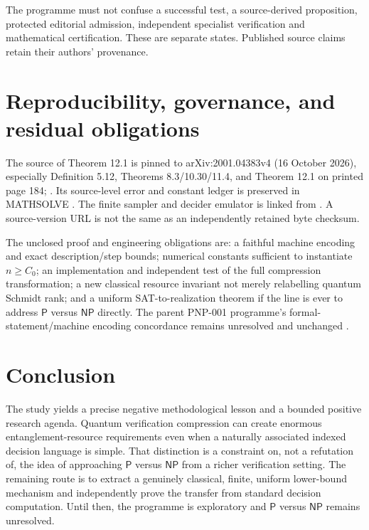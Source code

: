 \documentclass[11pt,a4paper]{article}
\newcommand{\Pclass}{\mathsf{P}}
\newcommand{\NPclass}{\mathsf{NP}}
\begin{document}
The programme must not confuse a successful test, a source-derived proposition, protected editorial admission, independent specialist verification and mathematical certification. These are separate states. Published source claims retain their authors' provenance.

\section{Reproducibility, governance, and residual obligations}
The source of Theorem 12.1 is pinned to arXiv:2001.04383v4 (16 October 2026), especially Definition 5.12, Theorems 8.3/10.30/11.4, and Theorem 12.1 on printed page 184; \cite{jnvwy}. Its source-level error and constant ledger is preserved in MATHSOLVE \cite{gclledger}. The finite sampler and decider emulator is linked from \cite{gclwitness}. A source-version URL is not the same as an independently retained byte checksum.

The unclosed proof and engineering obligations are: a faithful machine encoding and exact description/step bounds; numerical constants sufficient to instantiate $n\ge C_0$; an implementation and independent test of the full compression transformation; a new classical resource invariant not merely relabelling quantum Schmidt rank; and a uniform SAT-to-realization theorem if the line is ever to address $\Pclass$ versus $\NPclass$ directly. The parent PNP-001 programme's formal-statement/machine encoding concordance remains unresolved and unchanged \cite{gclparent}.

\section{Conclusion}
The study yields a precise negative methodological lesson and a bounded positive research agenda. Quantum verification compression can create enormous entanglement-resource requirements even when a naturally associated indexed decision language is simple. That distinction is a constraint on, not a refutation of, the idea of approaching $\Pclass$ versus $\NPclass$ from a richer verification setting. The remaining route is to extract a genuinely classical, finite, uniform lower-bound mechanism and independently prove the transfer from standard decision computation. Until then, the programme is exploratory and $\Pclass$ versus $\NPclass$ remains unresolved.

\appendix
\end{document}
